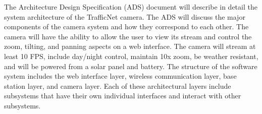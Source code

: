 The Architecture Design Specification (ADS) document will describe in detail the system architecture of the TrafficNet camera. The ADS will discuss the major components of the camera system and how they correspond to each other. The camera will have the ability to allow the user to view its stream and control the zoom, tilting, and panning aspects on a web interface. The camera will stream at least 10 FPS, include day/night control, maintain 10x zoom, be weather resistant, and will be powered from a solar panel and battery. The structure of the software system includes the web interface layer, wireless communication layer, base station layer, and camera layer. Each of these architectural layers include subsystems that have their own individual interfaces and interact with other subsystems.

